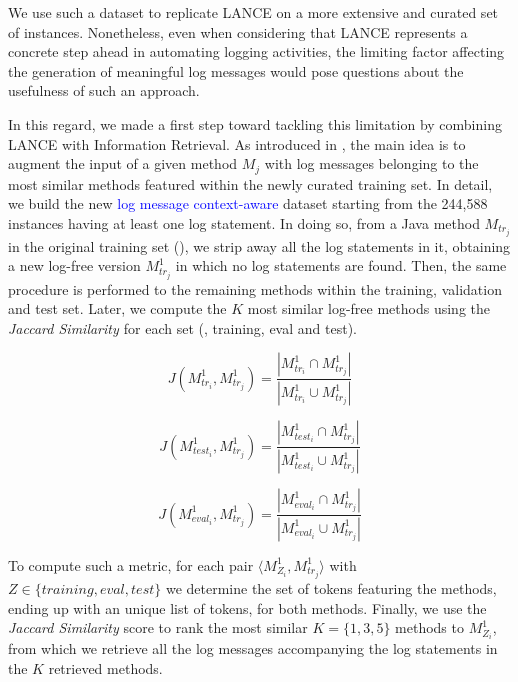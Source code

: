 We use such a dataset to replicate LANCE on a more extensive and curated set of instances.
Nonetheless, even when considering that LANCE represents a concrete step ahead in automating logging activities, the limiting factor affecting the generation of meaningful log messages would pose questions about the usefulness of such an approach.  

In this regard, we made a first step toward tackling this limitation by combining LANCE with Information Retrieval.
As introduced in , the main idea is to augment the input of a given \java method $M_{j}$ with log messages belonging to the most similar methods featured within the newly curated training set. In detail, we build the new  \textcolor{blue}{log message context-aware} dataset starting from the 244,588 instances having at least one log statement. In doing so, from a Java method $M_{tr_j}$ in the original training set (), we strip away all the log statements in it, obtaining a new log-free version $M_{tr_j}^{1}$ in which no log statements are found. Then, the  same procedure is performed to the remaining methods within the training, validation and test set. Later, we compute the $K$ most similar log-free methods using the \textit{Jaccard Similarity \cite{hancock2004jaccard}} for each set (\ie, training, eval and test).

\begin{equation}
	J(M_{tr_i}^{1}, M_{tr_j}^{1})=\frac{|M_{tr_i}^{1}  \cap M_{tr_j}^{1} |}{|M_{tr_i}^{1}  \cup M_{tr_j}^{1} |}
\end{equation}

\begin{equation}
	J(M_{test_i}^{1}, M_{tr_j}^{1})=\frac{|M_{test_i}^{1}  \cap M_{tr_j}^{1} |}{| M_{test_i}^{1}  \cup M_{tr_j}^{1} |}
\end{equation}


\begin{equation}
	J(M_{eval_i}^{1}, M_{tr_j}^{1})=\frac{|M_{eval_i}^{1} \cap M_{tr_j}^{1} |}{| M_{eval_i}^{1} \cup M_{tr_j}^{1} |}
\end{equation}

To compute such a metric, for each pair $\langle M_{Z_i}^{1}, M_{tr_j}^{1} \rangle$ with $Z \in \{ training, eval, test\}$ we determine the set of \java tokens featuring the methods, ending up with an unique list of tokens, for both methods.
Finally, we use the \textit{Jaccard Similarity} score to rank the most similar $K=\{1,3,5\}$ methods to $M_{Z_i}^{1}$, from which we retrieve all the log messages accompanying the log statements in the $K$ retrieved methods.

